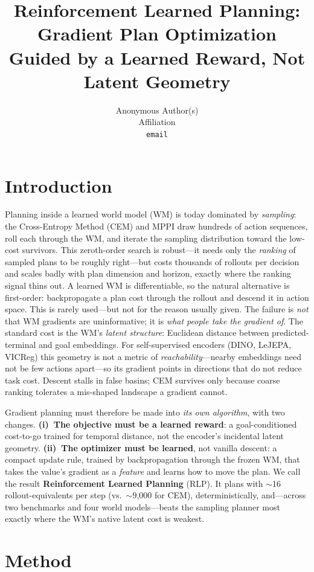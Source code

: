 \documentclass{article}
\title{Reinforcement Learned Planning: Gradient Plan Optimization\\ Guided by a Learned Reward, Not Latent Geometry}
\author{%
  Anonymous Author(s)\\
  Affiliation\\
  \texttt{email}\\
}
\begin{document}
\maketitle


\section{Introduction}

Planning inside a learned world model (WM) is today dominated by \emph{sampling}:
the Cross-Entropy Method (CEM) and MPPI draw hundreds of action sequences, roll
each through the WM, and iterate the sampling distribution toward the low-cost
survivors. This zeroth-order search is robust---it needs only the \emph{ranking}
of sampled plans to be roughly right---but costs thousands of rollouts per
decision and scales badly with plan dimension and horizon, exactly where the
ranking signal thins out. A learned WM is differentiable, so the natural
alternative is first-order: backpropagate a plan cost through the rollout and
descend it in action space. This is rarely used---but not for the reason usually
given. The failure is \emph{not} that WM gradients are uninformative; it is
\emph{what people take the gradient of}. The standard cost is the WM's
\emph{latent structure}: Euclidean distance between predicted-terminal and goal
embeddings. For self-supervised encoders (DINO, LeJEPA, VICReg) this geometry is
not a metric of \emph{reachability}---nearby embeddings need not be few actions
apart---so its gradient points in directions that do not reduce task cost.
Descent stalls in false basins; CEM survives only because coarse ranking
tolerates a mis-shaped landscape a gradient cannot.

Gradient planning must therefore be made into \emph{its own algorithm}, with two
changes. \textbf{(i)~The objective must be a learned reward}: a goal-conditioned
cost-to-go trained for temporal distance, not the encoder's incidental latent
geometry. \textbf{(ii)~The optimizer must be learned}, not vanilla descent: a
compact update rule, trained by backpropagation through the frozen WM, that takes
the value's gradient as a \emph{feature} and learns how to move the plan. We call
the result \textbf{Reinforcement Learned Planning} (RLP). It plans with
$\sim$16 rollout-equivalents per step (vs.\ $\sim$9{,}000 for CEM),
deterministically, and---across two benchmarks and four world models---beats the
sampling planner most exactly where the WM's native latent cost is weakest.


\section{Method}
\end{document}
